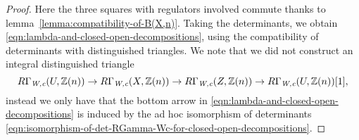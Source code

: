 \documentclass{article}
\numberwithin{equation}{section}
\begin{document}
\begin{lemma}
\begin{proof}
    Here the three squares with regulators involved commute thanks to
    lemma~\ref{lemma:compatibility-of-B(X,n)}. Taking the determinants, we
    obtain \eqref{eqn:lambda-and-closed-open-decompositions}, using the
    compatibility of determinants with distinguished triangles. We note that we
    did not construct an integral distinguished triangle
    \[ R\Gamma_{\text{\it W,c}} (U, \mathbb{Z} (n)) \to
      R\Gamma_{\text{\it W,c}} (X, \mathbb{Z} (n)) \to
      R\Gamma_{\text{\it W,c}} (Z, \mathbb{Z} (n)) \to
      R\Gamma_{\text{\it W,c}} (U, \mathbb{Z} (n)) [1], \]
    instead we only have that the bottom arrow in
    \eqref{eqn:lambda-and-closed-open-decompositions} is induced by the ad hoc
    isomorphism of determinants
    \eqref{eqn:isomorphism-of-det-RGamma-Wc-for-closed-open-decompositions}.
  \end{proof}
\end{lemma}
\end{document}
